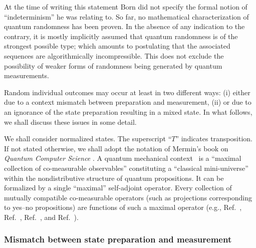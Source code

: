 \documentclass[10pt]{article}%
\begin{document}
At the time of writing this statement Born did not specify the formal notion of ``indeterminism'' he was relating to.
So far, no mathematical characterization of quantum randomness has been proven.
In the absence of any indication to the contrary, it is mostly implicitly assumed
that quantum randomness is of the strongest possible type;
which amounts to postulating that the associated sequences are algorithmically incompressible.
This does not exclude the possibility of weaker forms of randomness being generated by quantum measurements.


Random individual outcomes may occur at least in two different ways:
(i) either due to a context mismatch between preparation and measurement,
(ii) or
due to an ignorance of the state preparation resulting in a mixed state.
In what follows, we shall discuss these issues in some detail.


We shall consider normalized states.
The superscript ``$T$'' indicates transposition.
If not stated otherwise, we shall adopt the notation of Mermin's book on {\em Quantum Computer Science}
\cite{mermin-07}.
A quantum mechanical context~\cite{svozil-2008-ql}
is a ``maximal collection of co-measurable observables'' constituting
a ``classical mini-universe'' within the nondistributive structure of quantum propositions.
It can be formalized by a single  ``maximal'' self-adjoint operator.
Every collection of mutually compatible co-measurable operators (such as projections corresponding to yes--no propositions)
are functions of such a maximal operator
(e.g., Ref.~\cite[Sec.~II.10, p. 90, English translation p.~173]{v-neumann-49},
Ref.~\cite[\S~2]{kochen1}, Ref.~\cite[pp.~227,228]{neumark-54}, and Ref.~\cite[\S~84]{halmos-vs}).


\subsubsection{Mismatch between state preparation and measurement}
\label{2009-QvPR-s-mismatch}
\end{document}
